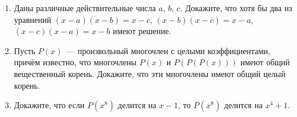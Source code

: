 \documentclass{article}
\begin{document}
\begin{enumerate}[label*=\protect\fbox{\arabic{enumi}}]
\item Даны различные действительные числа $a$, $b$, $c$. Докажите, что хотя бы два из уравнений $(x - a)(x - b) = x - c$, $(x - b)(x - c) = x - a$, $(x - c)(x - a) = x - b$ имеют решение.

\item Пусть $P(x)$~--- произвольный многочлен с целыми коэффициентами, причём известно, что многочлены $P(x)$ и $P(P(P(x)))$ имеют общий вещественный корень. Докажите, что эти многочлены имеют общий целый корень.

\item Докажите, что если $P(x^8)$ делится на $x-1$, то $P(x^8)$ делится на $x^4+1$.



\end{enumerate}
\end{document}
